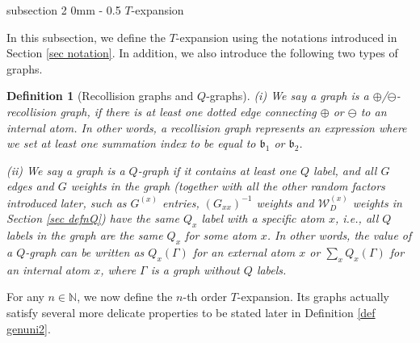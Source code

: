 \documentclass{article}
\makeatletter
\newcommand{\1}{\mathds{1}}
\numberwithin{equation}{section}
\newcommand{\fb}{{\mathfrak b}}
\renewcommand{\cal}{\mathcal}
\newcommand{\N}{\mathbb{N}}
\theoremstyle{plain} %
\newtheorem{definition}[theorem]{Definition}
\theoremstyle{remark}
\renewcommand{\subsection}{\@startsection
	{subsection}%
	{2}%
	{0mm}%
	{-\baselineskip}%
	{0.5\baselineskip}%
	{\normalfont\bf\itshape}} %
\makeatother
\begin{document}
\subsection{$T$-expansion}\label{sec Texp2}


In this subsection, we define the $T$-expansion using the notations introduced in Section \ref{sec notation}. In addition, we also introduce the following two types of graphs. 
 
\begin{definition}[Recollision graphs and $Q$-graphs]\label{Def_recoll}
(i) We say a graph is a $\oplus$/$\ominus$-recollision graph, if there is at least one dotted edge connecting $\oplus$ or $\ominus$ to an internal atom. In other words, a recollision graph represents an expression where we set at least one summation index to be equal to $\fb_1$ or $\fb_2$.
 	
\medskip
\noindent(ii) We say a graph is a $Q$-graph if it contains at least one $Q$ label, and all  $G$ edges and $G$ weights in the graph (together with all the other random factors introduced later, such as $G^{(x)}$ entries, $(G_{xx})^{-1}$ weights and $\cal W^{(x)}_{D}$ weights in Section \ref{sec defnQ}) have the same $Q_x$ label with a specific atom $x$, i.e., %
all $Q$ labels in the graph are the same $Q_x$ for some atom $x$. In other words, the value of a $Q$-graph can be written as $Q_x(\Gamma)$ for an external atom $x$ or $\sum_x Q_x(\Gamma)$ for an internal atom $x$, where $\Gamma$ is a graph without $Q$ labels. 
\end{definition}
 
 
For any $n\in \N$, we now define the $n$-th order $T$-expansion. Its graphs actually satisfy several more delicate properties to be stated later in %
Definition \ref{def genuni2}. 
\end{document}
